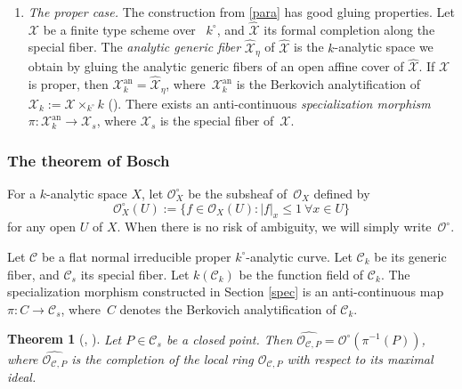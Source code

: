 \documentclass[JEP,XML,SOM,Unicode,NoFloatCountersInSection,published]{cedram}
\newtheorem{thm}{Theorem}[section]
\theoremstyle{definition}
\begin{document}
\begin{enumerate}
\item
\emph{The proper case.}
The construction from \eqref{para} has good gluing properties. Let $\mathscr{X}$ be a finite type scheme over ~$k^{\circ}$, and $\widehat{\mathscr{X}}$ its formal completion along the special fiber. The \textit{analytic generic fiber} $\widehat{\mathscr{X}}_\eta$ of $\widehat{\mathscr{X}}$ is the $k$-analytic space we obtain by gluing the analytic generic fibers of an open affine cover of $\widehat{\mathscr{X}}$. If $\mathscr{X}$ is proper, then $\mathscr{X}_k^{\mathrm{an}}=\widehat{\mathscr{X}}_{\eta}$, where~$\mathscr{X}_k^{\mathrm{an}}$ is the Berkovich analytification of $\mathscr{X}_k:=\mathscr{X} \times_{k^{\circ}} k$ (\cf \cite[2.2.2]{muni}). There exists an anti-continuous \textit{specialization morphism} $\pi: \mathscr{X}_k^{\mathrm{an}} \to \mathscr{X}_s$, where $\mathscr{X}_s$ is the special fiber of~$\mathscr{X}$.
\end{enumerate}

\subsubsection{The theorem of Bosch}

For a $k$-analytic space $X$, let $\mathcal{O}^{\circ}_X$ be the subsheaf of~$\mathcal{O}_X$ defined by
\begin{equation} \label{ozero}
\mathcal{O}_X^{\circ}(U):=\{f \in \mathcal{O}_X(U): |f|_x \leqslant 1 \ \forall x \in U\}\end{equation}
for any open $U$ of $X$.
When there is no risk of ambiguity, we will simply write~$\mathcal{O}^{\circ}$.

Let $\mathscr{C}$ be a flat normal irreducible proper $k^{\circ}$-analytic curve. Let $\mathscr{C}_k$ be its generic fiber, and $\mathscr{C}_s$ its special fiber. Let $k(\mathscr{C}_k)$ be the function field of $\mathscr{C}_k$. The specialization morphism constructed in Section \ref{spec} is an anti-continuous map $\pi: C \to \mathscr{C}_s$, where~$C$ denotes the Berkovich analytification of $\mathscr{C}_k$.

\begin{thm}[{\cite[Th.\,5.8]{bo1}, \cite[Th.\,3.1]{mart}}] \label{bosh}
Let $P \in \mathscr{C}_s$ be a closed point. Then $\widehat{\mathcal{O}_{\mathscr{C}, P}}=\mathcal{O}^{\circ}(\pi^{-1}(P))$, where $\widehat{\mathcal{O}_{\mathscr{C}, P}}$ is the completion of the local ring $\mathcal{O}_{\mathscr{C}, P}$ with respect to its maximal ideal.
\end{thm}
\end{document}
